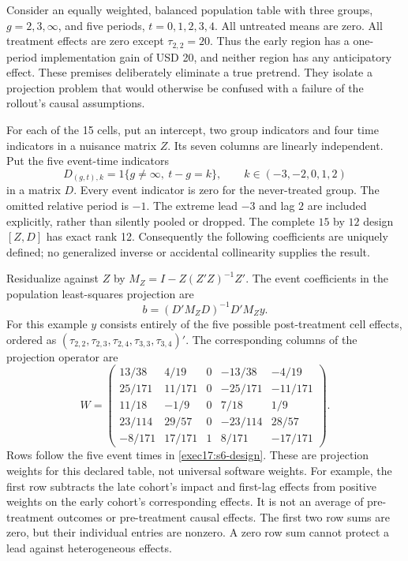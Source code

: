 Consider an equally weighted, balanced population table with three groups,
$g=2,3,\infty$, and five periods, $t=0,1,2,3,4$. All untreated means are zero.
All treatment effects are zero except $\tau_{2,2}=20$. Thus the early region
has a one-period implementation gain of USD 20, and neither region has any
anticipatory effect. These premises deliberately eliminate a true pretrend.
They isolate a projection problem that would otherwise be confused with a
failure of the rollout's causal assumptions.

For each of the 15 cells, put an intercept, two group indicators and four
time indicators in a nuisance matrix $Z$. Its seven columns are linearly
independent. Put the five event-time indicators
\begin{equation}
 D_{(g,t),k}=1\{g\ne\infty,\ t-g=k\},
 \qquad k\in(-3,-2,0,1,2)
 \label{exec17:s6-design}
\end{equation}
in a matrix $D$. Every event indicator is zero for the never-treated group.
The omitted relative period is $-1$. The extreme lead $-3$ and lag $2$
are included explicitly, rather than silently pooled or dropped. The complete
$15$ by $12$ design $[Z,D]$ has exact rank 12. Consequently the following
coefficients are uniquely defined; no generalized inverse or accidental
collinearity supplies the result.

Residualize against $Z$ by $M_Z=I-Z(Z'Z)^{-1}Z'$. The event coefficients
in the population least-squares projection are
\begin{equation}
 b=(D'M_ZD)^{-1}D'M_Zy.
 \label{exec17:s6-fwl}
\end{equation}
For this example $y$ consists entirely of the five possible post-treatment
cell effects, ordered as
$(\tau_{2,2},\tau_{2,3},\tau_{2,4},\tau_{3,3},\tau_{3,4})'$.
The corresponding columns of the projection operator are
\begin{equation}
 W=
 \begin{pmatrix}
 13/38&4/19&0&-13/38&-4/19\\
 25/171&11/171&0&-25/171&-11/171\\
 11/18&-1/9&0&7/18&1/9\\
 23/114&29/57&0&-23/114&28/57\\
 -8/171&17/171&1&8/171&-17/171
 \end{pmatrix}.
 \label{exec17:s6-projection}
\end{equation}
Rows follow the five event times in \eqref{exec17:s6-design}. These are
projection weights for this declared table, not universal software weights.
For example, the first row subtracts the late cohort's impact and first-lag
effects from positive weights on the early cohort's corresponding effects.
It is not an average of pre-treatment outcomes or pre-treatment causal
effects. The first two row sums are zero, but their individual entries are
nonzero. A zero row sum cannot protect a lead against heterogeneous effects.

